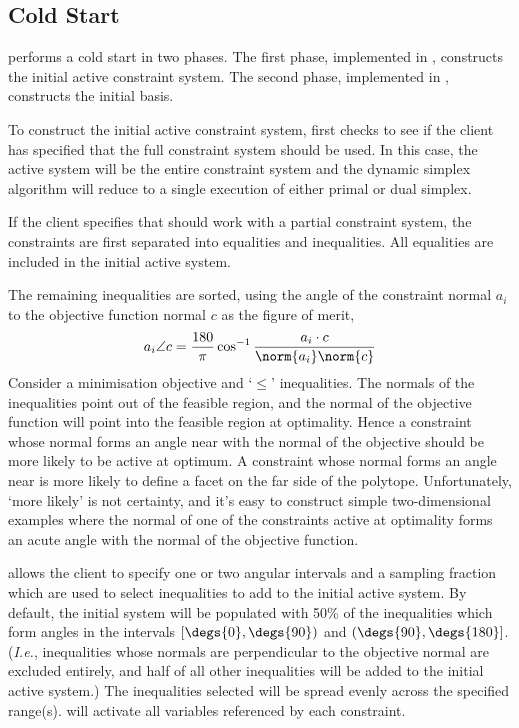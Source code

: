 \subsection{Cold Start}
\label{sec:ColdStart}

\dylp performs a cold start in two phases.
The first phase, implemented in , constructs the initial
active constraint system.
The second phase, implemented in , constructs the initial
basis.

To construct the initial active constraint system,  first
checks to see if the client has specified that the full constraint system
should be used.
In this case, the active system will be the entire constraint system and the
dynamic simplex algorithm will reduce to a single execution of either primal or
dual simplex.

If the client specifies that \dylp should work with a partial constraint
system, the constraints are first separated into equalities and inequalities.
All equalities are included in the initial active system.

The remaining inequalities are sorted, using the angle of the
constraint normal $a_i$ to the objective function normal $c$ as the figure
of merit,
\begin{equation*}
a_i \angle c = \frac{180}{\pi} \cos^{-1} \frac{a_i \cdot c}{\norm{a_i}\norm{c}}
\end{equation*}
Consider a minimisation objective and `$\leq$' inequalities.
The normals of the inequalities point out of the feasible region, and the
normal of the objective function will point into the feasible region at
optimality.
Hence a constraint whose normal forms an angle near  with the normal
of the objective should be more likely to be active at optimum.
A constraint whose normal forms an angle near  is more likely to define
a facet on the far side of the polytope.
Unfortunately, `more likely' is not certainty, and it's easy to
construct simple
two-dimensional examples where the normal of one of the constraints active
at optimality forms an acute angle with the normal of the objective function.

\dylp allows the client to specify one or two angular intervals and a sampling
fraction which are used to select inequalities to add to the initial
active system.
By default, the initial system will be populated with 50\% of the
inequalities which form angles in the intervals
$[\degs{0},\degs{90})$ and $(\degs{90},\degs{180}]$.
(\textit{I.e.}, inequalities whose normals are perpendicular to the objective
normal are excluded entirely, and half of all other inequalities will be
added to the initial active system.)
The inequalities selected will be spread evenly across the specified range(s).
\dylp will activate all variables referenced by each constraint.

